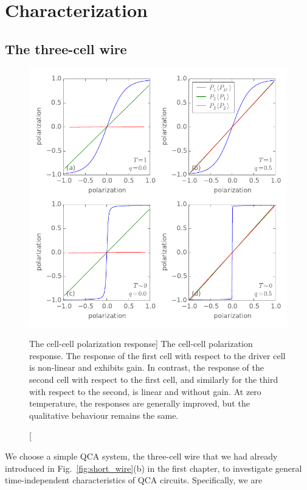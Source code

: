 \chapter{Characterization}
\graphicspath{{../gfx/chapter03/}{../plots/chapter03/}}


\section{The three-cell wire}

%
\begin{figure}
  \center
  \includegraphics{three_cells_PP}
  \caption
  [The cell-cell polarization response]
  {
  The cell-cell polarization response. The response of the first cell with
  respect to the driver cell is non-linear and exhibits gain. In contrast, the
  response of the second cell with respect to the first cell, and similarly
  for the third with respect to the second, is linear and without gain. At zero
  temperature, the responses are generally improved, but the qualitative
  behaviour remains the same.
  }
  \label{fig:three_cells_PP}
\end{figure}
%
We choose a simple QCA system, the three-cell wire that we had already
introduced in Fig.~\ref{fig:short_wire}(b) in the first chapter, to investigate
general time-independent characteristics of QCA circuits. Specifically, we are
